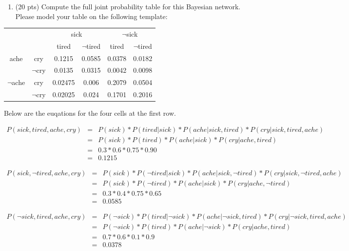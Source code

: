 \documentclass{article}%
\begin{document}
\begin{enumerate}
\begin{enumerate}
		\item (20 pts) Compute the full joint probability table for this Bayesian network. Please model your table on the following template:
	\end{enumerate}
	
	\begin{table}[h]
	\centering
	\begin{tabular}{|c|c|c|c|c|c|}
	\hline
	\multicolumn{2}{|c|}{}&\multicolumn{2}{c|}{sick}&\multicolumn{2}{c|}{$\neg$sick} \\ \cline{3-6}
	\multicolumn{2}{|c|}{}&tired&$\neg$tired&tired&$\neg$tired \\ \hline
	ache&cry& 0.1215& 0.0585& 0.0378 & 0.0182\\ \cline{2-6}
	&$\neg$cry& 0.0135&0.0315 &0.0042 & 0.0098\\ \hline
	$\neg$ache&cry& 0.02475 &0.006 & 0.2079& 0.0504\\ \cline{2-6}
	&$\neg$cry& 0.02025&0.024 &0.1701 & 0.2016\\ \hline
	\end{tabular}
	\end{table}
	
	Below are the euqations for the four cells at the first row.
	
	\[
	 \begin{array}{lcl} P(sick, tired, ache, cry)& = &P(sick) * P(tired | sick) * P(ache | sick, tired) * P(cry| sick,tired,ache) \\
 	 						   &=&P(sick) * P(tired) * P(ache|sick) * P(cry|ache,tired) \\
 	 						   &=&0.3*0.6 *0.75*0.90\\
 	 						   &=&0.1215 
 	 \end{array}	 
 	 \]
 	 
 	 \[
	 \begin{array}{lcl} P(sick, \neg tired, ache, cry)& = &P(sick) * P(\neg tired | sick) * P(ache | sick, \neg tired) * P(cry| sick,\neg tired,ache) \\
 	 						   &=&P(sick) * P(\neg tired) * P(ache|sick) * P(cry|ache,\neg tired) \\
 	 						   &=&0.3*0.4 *0.75*0.65\\
 	 						   &=&0.0585
 	 \end{array}	 
 	 \]
 	 
 	 
	\[
	 \begin{array}{lcl} P(\neg sick, tired, ache, cry)& = &P(\neg sick) * P(tired | \neg sick) * P(ache | \neg sick, tired) * P(cry| \neg sick,tired,ache) \\
 	 						   &=&P(\neg sick) * P(tired) * P(ache|\neg sick) * P(cry|ache,tired) \\
 	 						   &=&0.7*0.6 *0.1*0.9\\
 	 						   &=&0.0378 
 	 \end{array}	 
 	 \]
 	 

\end{enumerate}
\end{document}
